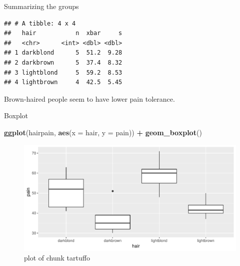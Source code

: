 \documentclass[ignorenonframetext,]{beamer}
\newenvironment{Shaded}{\begin{snugshade}}{\end{snugshade}}
\newcommand{\DataTypeTok}[1]{\textcolor[rgb]{0.13,0.29,0.53}{#1}}
\newcommand{\KeywordTok}[1]{\textcolor[rgb]{0.13,0.29,0.53}{\textbf{#1}}}
\newcommand{\NormalTok}[1]{#1}
\newcommand{\OperatorTok}[1]{\textcolor[rgb]{0.81,0.36,0.00}{\textbf{#1}}}
\newcommand{\StringTok}[1]{\textcolor[rgb]{0.31,0.60,0.02}{#1}}
\begin{document}
\begin{frame}[fragile]{Summarizing the groups}
\protect\hypertarget{summarizing-the-groups}{}

\footnotesize

\begin{Shaded}
\end{Shaded}

\begin{verbatim}
## # A tibble: 4 x 4
##   hair           n  xbar     s
##   <chr>      <int> <dbl> <dbl>
## 1 darkblond      5  51.2  9.28
## 2 darkbrown      5  37.4  8.32
## 3 lightblond     5  59.2  8.53
## 4 lightbrown     4  42.5  5.45
\end{verbatim}

\normalsize

Brown-haired people seem to have lower pain tolerance.

\end{frame}

\begin{frame}[fragile]{Boxplot}
\protect\hypertarget{boxplot}{}

\begin{Shaded}
\begin{Highlighting}[]
\KeywordTok{ggplot}\NormalTok{(hairpain, }\KeywordTok{aes}\NormalTok{(}\DataTypeTok{x =}\NormalTok{ hair, }\DataTypeTok{y =}\NormalTok{ pain)) }\OperatorTok{+}\StringTok{ }\KeywordTok{geom_boxplot}\NormalTok{()}
\end{Highlighting}
\end{Shaded}

\begin{figure}
\centering
\includegraphics{figure/tartuffo-1.pdf}
\caption{plot of chunk tartuffo}
\end{figure}

\end{frame}
\end{document}
